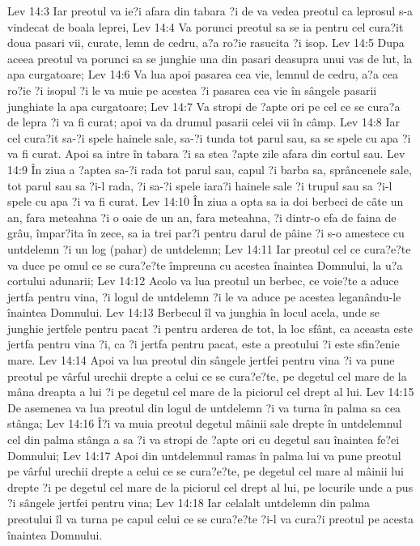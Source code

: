 Lev 14:3  Iar preotul va ie?i afara din tabara ?i de va vedea preotul ca leprosul s-a vindecat de boala leprei,
Lev 14:4  Va porunci preotul sa se ia pentru cel cura?it doua pasari vii, curate, lemn de cedru, a?a ro?ie rasucita ?i isop.
Lev 14:5  Dupa aceea preotul va porunci sa se junghie una din pasari deasupra unui vas de lut, la apa curgatoare;
Lev 14:6  Va lua apoi pasarea cea vie, lemnul de cedru, a?a cea ro?ie ?i isopul ?i le va muie pe acestea ?i pasarea cea vie în sângele pasarii junghiate la apa curgatoare;
Lev 14:7  Va stropi de ?apte ori pe cel ce se cura?a de lepra ?i va fi curat; apoi va da drumul pasarii celei vii în câmp.
Lev 14:8  Iar cel cura?it sa-?i spele hainele sale, sa-?i tunda tot parul sau, sa se spele cu apa ?i va fi curat. Apoi sa intre în tabara ?i sa stea ?apte zile afara din cortul sau.
Lev 14:9  În ziua a ?aptea sa-?i rada tot parul sau, capul ?i barba sa, sprâncenele sale, tot parul sau sa ?i-l rada, ?i sa-?i spele iara?i hainele sale ?i trupul sau sa ?i-l spele cu apa ?i va fi curat.
Lev 14:10  În ziua a opta sa ia doi berbeci de câte un an, fara meteahna ?i o oaie de un an, fara meteahna, ?i dintr-o efa de faina de grâu, împar?ita în zece, sa ia trei par?i pentru darul de pâine ?i s-o amestece cu untdelemn ?i un log (pahar) de untdelemn;
Lev 14:11  Iar preotul cel ce cura?e?te va duce pe omul ce se cura?e?te împreuna cu acestea înaintea Domnului, la u?a cortului adunarii;
Lev 14:12  Acolo va lua preotul un berbec, ce voie?te a aduce jertfa pentru vina, ?i logul de untdelemn ?i le va aduce pe acestea leganându-le înaintea Domnului.
Lev 14:13  Berbecul îl va junghia în locul acela, unde se junghie jertfele pentru pacat ?i pentru arderea de tot, la loc sfânt, ca aceasta este jertfa pentru vina ?i, ca ?i jertfa pentru pacat, este a preotului ?i este sfin?enie mare.
Lev 14:14  Apoi va lua preotul din sângele jertfei pentru vina ?i va pune preotul pe vârful urechii drepte a celui ce se cura?e?te, pe degetul cel mare de la mâna dreapta a lui ?i pe degetul cel mare de la piciorul cel drept al lui.
Lev 14:15  De asemenea va lua preotul din logul de untdelemn ?i va turna în palma sa cea stânga;
Lev 14:16  Î?i va muia preotul degetul mâinii sale drepte în untdelemnul cel din palma stânga a sa ?i va stropi de ?apte ori cu degetul sau înaintea fe?ei Domnului;
Lev 14:17  Apoi din untdelemnul ramas în palma lui va pune preotul pe vârful urechii drepte a celui ce se cura?e?te, pe degetul cel mare al mâinii lui drepte ?i pe degetul cel mare de la piciorul cel drept al lui, pe locurile unde a pus ?i sângele jertfei pentru vina;
Lev 14:18  Iar celalalt untdelemn din palma preotului îl va turna pe capul celui ce se cura?e?te ?i-l va cura?i preotul pe acesta înaintea Domnului.
